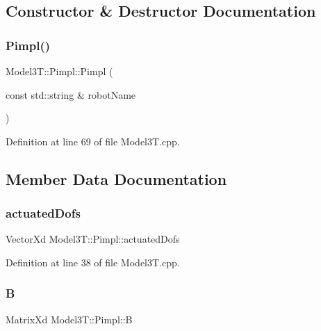 \subsection{Constructor \& Destructor Documentation}
\hypertarget{structModel3T_1_1Pimpl_a087fecc74d3a9f4867e971a6f4f379ef}{}\label{structModel3T_1_1Pimpl_a087fecc74d3a9f4867e971a6f4f379ef} 
\subsubsection{\texorpdfstring{Pimpl()}{Pimpl()}}
{\footnotesize\ttfamily Model3\+T\+::\+Pimpl\+::\+Pimpl (\begin{DoxyParamCaption}\item[{const std\+::string \&}]{robot\+Name }\end{DoxyParamCaption})\hspace{0.3cm}{\ttfamily [inline]}}



Definition at line 69 of file Model3\+T.\+cpp.



\subsection{Member Data Documentation}
\hypertarget{structModel3T_1_1Pimpl_a7bf8960ca39185d73d9dcc28451ae7a3}{}\label{structModel3T_1_1Pimpl_a7bf8960ca39185d73d9dcc28451ae7a3} 
\subsubsection{\texorpdfstring{actuated\+Dofs}{actuatedDofs}}
{\footnotesize\ttfamily Vector\+Xd Model3\+T\+::\+Pimpl\+::actuated\+Dofs}



Definition at line 38 of file Model3\+T.\+cpp.

\hypertarget{structModel3T_1_1Pimpl_a79e662bd2907360085b1adda5a2217b6}{}\label{structModel3T_1_1Pimpl_a79e662bd2907360085b1adda5a2217b6} 
\subsubsection{\texorpdfstring{B}{B}}
{\footnotesize\ttfamily Matrix\+Xd Model3\+T\+::\+Pimpl\+::B}



